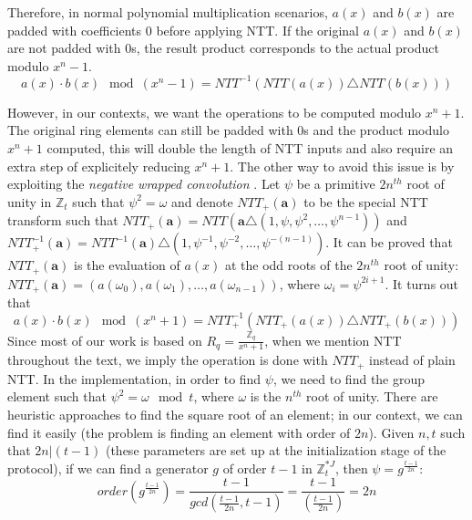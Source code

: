 \begin{description}
  Therefore, in normal polynomial multiplication scenarios, \(a(x)\) and \(b(x)\)
  are padded with coefficients 0 before applying NTT. If the original \(a(x)\)
  and \(b(x)\) are not padded with 0s, the result product corresponds to the
  actual product modulo \(x^{n} - 1\).
  \[
a(x) \cdot b(x) \mod (x^{n} - 1) = NTT^{-1}(NTT(a(x)) \triangle NTT(b(x)))
  \]

  However, in our contexts, we want the operations to be computed modulo
  \(x^{n} + 1\). The original ring elements can still be padded with 0s and
   the product modulo \(x^{n} + 1\) computed, this will double the length of NTT
  inputs and also require an extra step of explicitely reducing \(x^{n} + 1\). The
  other way to avoid this issue is by exploiting the \textit{negative wrapped
    convolution} \cite{lyubashevsky2008swifft}. Let \(\psi\) be a primitive
  \(2n^{th}\) root of unity in \(\mathbb{Z}_{t}\) such that
  \(\psi^{2} = \omega\) and denote \(NTT_{+}(\mathbf{a})\) to be the special NTT
  transform such that
  \(NTT_{+}(\mathbf{a}) = NTT(\mathbf{a} \triangle (1, \psi, \psi^{2}, \dots,
  \psi^{n-1}))\) and
  \(NTT_{+}^{-1}(\mathbf{a}) = NTT^{-1}(\mathbf{a}) \triangle (1, \psi^{-1},
  \psi^{-2}, \dots, \psi^{-(n-1)})\). It can be proved that
  \(NTT_{+}(\mathbf{a})\) is the evaluation of \(a(x)\) at the odd roots of the
  \(2n^{th}\) root of unity:
  \(NTT_{+}(\mathbf{a}) = (a(\omega_{0}), a(\omega_{1}), \dots,
  a(\omega_{n-1}))\), where \(\omega_{i} = \psi^{2i + 1}\). It turns out that
  \[
a(x) \cdot b(x) \mod (x^{n} + 1) = NTT_{+}^{-1}(NTT_{+}(a(x)) \triangle NTT_{+}(b(x)))
  \]
  Since most of our work is  based on
  \(R_{q} = \frac{\mathbb{Z}_{q}}{x^{n} + 1}\), when we mention NTT throughout
  the text, we imply the operation is done with \(NTT_{+}\) instead of plain
  NTT. In the implementation, in order to find \(\psi\), we need to find the
  group element such that \(\psi^{2} = \omega \mod t\), where \(\omega\) is the
  \(n^{th}\) root of unity. There are heuristic approaches to find the square
  root of an element; in our context, we can find it easily (the problem is
  finding an element with order of \(2n\)). Given \(n, t\) such that
  \(2n | (t - 1)\) (these parameters are set up at the initialization stage of
  the protocol), if we can find a generator \(g\) of order \(t -1\) in
  \(\mathbb{Z}_t^{*J}\), then \(\psi = g^{\frac{t-1}{2n}}\):
\[
  order(g^{\frac{t-1}{2n}}) = \frac{t-1}{gcd(\frac{t-1}{2n},t-1)} =
  \frac{t-1}{(\frac{t-1}{2n})} = 2n
\]

\end{description}






